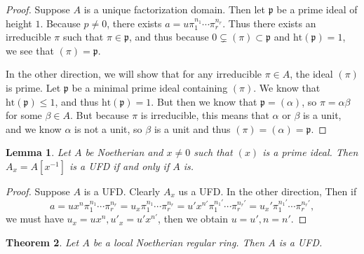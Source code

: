 \documentclass[leqno, openany]{memoir}
\newtheorem{thm}{Theorem}[section]
\newtheorem{lem}[thm]{Lemma}
\theoremstyle{definition}
\theoremstyle{remark}
\theoremstyle{plain}
\theoremstyle{definition}
\theoremstyle{remark}
\newcommand{\mf}[1]{\mathfrak{#1}}
\newcommand{\mr}[1]{\mathrm{#1}}
\begin{document}
\begin{proof} Suppose $A$ is a unique factorization domain. Then let $\mf{p}$
    be a prime ideal of height $1$. Because $p \neq 0$, there exists $a = u
    \pi_1^{n_1} \cdots \pi_r^{n_r}$. Thus there exists an irreducible $\pi$
    such that $\pi \in \mf{p}$, and thus because $0 \subsetneq (\pi) \subset
    \mf{p}$ and $\mr{ht}(\mf{p}) = 1$, we see that $(\pi) = \mf{p}$.

    In the other direction, we will show that for any irreducible $\pi \in A$,
the ideal $(\pi)$ is prime. Let $\mf{p}$ be a minimal prime ideal containing
$(\pi)$. We know that $\mr{ht}(\mf{p}) \leq 1$, and thus $\mr{ht}(\mf{p}) = 1$.
But then we know that $\mf{p} = (\alpha)$, so $\pi = \alpha \beta$ for some
$\beta \in A$. But because $\pi$ is irreducible, this means that $\alpha$ or
$\beta$ is a unit, and we know $\alpha$ is not a unit, so $\beta$ is a unit and
thus $(\pi) = (\alpha) = \mf{p}$.  \end{proof}

\begin{lem} Let $A$ be Noetherian and $x \neq 0$ such that $(x)$ is a prime
ideal. Then $A_x = A[x^{-1}]$ is a UFD if and only if $A$ is.  \end{lem}

\begin{proof} Suppose $A$ is a UFD. Clearly $A_x$ us a UFD. In the other
    direction, Then if \[ a = u x^n \pi_1^{n_1} \cdots \pi_r^{n_r} = u_x
    \pi_1^{n_1} \cdots \pi_r^{n_r} = u' x^{n'} \pi_1^{n_1'} \cdots \pi_r^{n_r'}
= u_x' \pi_1^{n_1'} \cdots \pi_r^{n_r'}, \] we must have $u_x = u x^n, u'_x =
u' x^{n'}$, then we obtain $u = u', n = n'$.  \end{proof}

\begin{thm} Let $A$ be a local Noetherian regular ring. Then $A$ is a UFD.
\end{thm}
\end{document}
